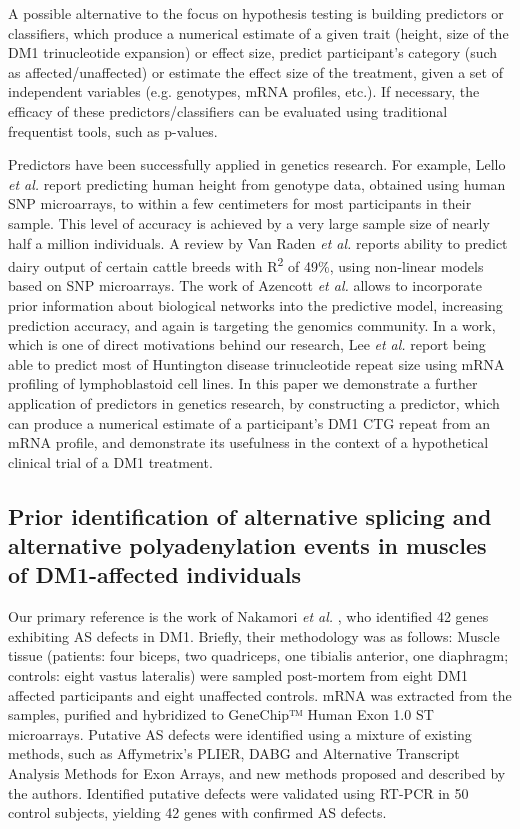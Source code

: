 \documentclass[10pt,letterpaper]{article}
\begin{document}
A possible alternative to the focus on hypothesis testing is building predictors or classifiers, which produce a numerical estimate of a given trait (height, size of the DM1 trinucleotide expansion) or effect size, predict participant's category (such as affected/unaffected) or estimate the effect size of the treatment, given a set of independent variables (e.g. genotypes, mRNA profiles, etc.). If necessary, the efficacy of these predictors/classifiers can be evaluated using traditional frequentist tools, such as p-values.

Predictors have been successfully applied in genetics research. For example, Lello {\it et al.} \cite{Lello2017} report predicting human height from genotype data, obtained using human SNP microarrays, to within a few centimeters for most participants in their sample. This level of accuracy is achieved by a very large sample size of nearly half a million individuals. A review by Van Raden {\it et al.} \cite{VanRaden2009} reports ability to predict dairy output of certain cattle breeds with R\textsuperscript{2} of 49\%, using non-linear models based on SNP microarrays. The work of Azencott {\it et al.} \cite{Azencott2013} allows to incorporate prior information about biological networks into the predictive model, increasing prediction accuracy, and again is targeting the genomics community. In a work, which is one of direct motivations behind our research, Lee {\it et al.} \cite{Lee2013} report being able to predict most of Huntington disease trinucleotide repeat size using mRNA profiling of lymphoblastoid cell lines. In this paper we demonstrate a further application of predictors in genetics research, by constructing a predictor, which can produce a numerical estimate of a participant's DM1 CTG repeat from an mRNA profile, and demonstrate its usefulness in the context of a hypothetical clinical trial of a DM1 treatment.

\subsection*{Prior identification of alternative splicing and alternative polyadenylation events in muscles of DM1-affected individuals}\label{prior_work}

Our primary reference is the work of Nakamori {\it et al.} \cite{Nakamori2013}, who identified 42 genes exhibiting AS defects in DM1. Briefly, their methodology was as follows:
Muscle tissue (patients: four biceps, two quadriceps, one tibialis anterior, one diaphragm; controls: eight vastus lateralis) were sampled post-mortem from eight DM1 affected participants and eight unaffected controls.
mRNA was extracted from the samples, purified and hybridized to GeneChip™ Human Exon 1.0 ST microarrays.
Putative AS defects were identified using a mixture of existing methods, such as Affymetrix's PLIER, DABG and Alternative Transcript Analysis Methods for Exon Arrays, and new methods proposed and described by the authors.
Identified putative defects were validated using RT-PCR in 50 control subjects, yielding 42 genes with confirmed AS defects.
\end{document}
